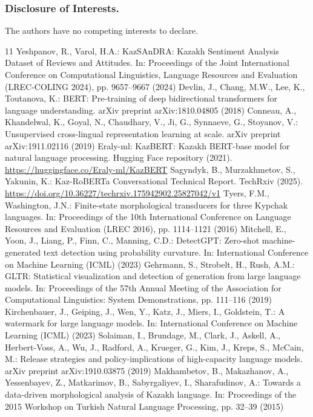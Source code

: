 \documentclass[runningheads]{llncs}
\begin{document}
\subsubsection{Disclosure of Interests.}
The authors have no competing interests to declare.
\begin{thebibliography}{11}
Yeshpanov, R., Varol, H.A.: KazSAnDRA: Kazakh Sentiment Analysis Dataset of Reviews and Attitudes. In: Proceedings of the Joint International Conference on Computational Linguistics, Language Resources and Evaluation (LREC-COLING 2024), pp. 9657–9667 (2024)
Devlin, J., Chang, M.W., Lee, K., Toutanova, K.: BERT: Pre-training of deep bidirectional transformers for language understanding. arXiv preprint arXiv:1810.04805 (2018)
Conneau, A., Khandelwal, K., Goyal, N., Chaudhary, V., Ji, G., Synnaeve, G., Stoyanov, V.: Unsupervised cross-lingual representation learning at scale. arXiv preprint arXiv:1911.02116 (2019)
Eraly-ml: KazBERT: Kazakh BERT-base model for natural language processing. Hugging Face repository (2021). \url{https://huggingface.co/Eraly-ml/KazBERT}
Sagyndyk, B., Murzakhmetov, S., Yakunin, K.: Kaz-RoBERTa Conversational Technical Report. TechRxiv (2025). \url{https://doi.org/10.36227/techrxiv.175942902.25827042/v1}
Tyers, F.M., Washington, J.N.: Finite-state morphological transducers for three Kypchak languages. In: Proceedings of the 10th International Conference on Language Resources and Evaluation (LREC 2016), pp. 1114–1121 (2016)
Mitchell, E., Yoon, J., Liang, P., Finn, C., Manning, C.D.: DetectGPT: Zero-shot machine-generated text detection using probability curvature. In: International Conference on Machine Learning (ICML) (2023)
Gehrmann, S., Strobelt, H., Rush, A.M.: GLTR: Statistical visualization and detection of generation from large language models. In: Proceedings of the 57th Annual Meeting of the Association for Computational Linguistics: System Demonstrations, pp. 111–116 (2019)
Kirchenbauer, J., Geiping, J., Wen, Y., Katz, J., Miers, I., Goldstein, T.: A watermark for large language models. In: International Conference on Machine Learning (ICML) (2023)
Solaiman, I., Brundage, M., Clark, J., Askell, A., Herbert-Voss, A., Wu, J., Radford, A., Krueger, G., Kim, J., Kreps, S., McCain, M.: Release strategies and policy-implications of high-capacity language models. arXiv preprint arXiv:1910.03875 (2019)
Makhambetov, B., Makazhanov, A., Yessenbayev, Z., Matkarimov, B., Sabyrgaliyev, I., Sharafudinov, A.: Towards a data-driven morphological analysis of Kazakh language. In: Proceedings of the 2015 Workshop on Turkish Natural Language Processing, pp. 32–39 (2015)
\end{thebibliography}
\end{document}
